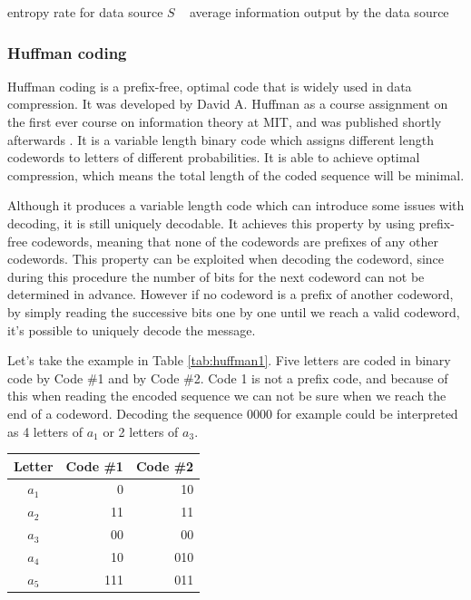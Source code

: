       entropy rate for data source $S$ ~ average information output by the data source

    \subsubsection{Huffman coding}
      Huffman coding is a prefix-free, optimal code that is widely used in data compression. It was developed by David A. Huffman as a course assignment on the first ever course on information theory at MIT, and was published shortly afterwards \cite{huffman_method_1952}. It is a variable length binary code which assigns different length codewords to letters of different probabilities. It is able to achieve optimal compression, which means the total length of the coded sequence will be minimal.

      Although it produces a variable length code which can introduce some issues with decoding, it is still uniquely decodable. It achieves this property by using prefix-free codewords, meaning that none of the codewords are prefixes of any other codewords. This property can be exploited when decoding the codeword, since during this procedure the number of bits for the next codeword can not be determined in advance. However if no codeword is a prefix of another codeword, by simply reading the successive bits one by one until we reach a valid codeword, it's possible to uniquely decode the message.

      Let's take the example in Table \ref{tab:huffman1}. Five letters are coded in binary code by Code \#1 and by Code \#2. Code 1 is not a prefix code, and because of this when reading the encoded sequence we can not be sure when we reach the end of a codeword. Decoding the sequence 0000 for example could be interpreted as 4 letters of $a_1$ or 2 letters of $a_3$.

      \begin{table}
        \centering
        \begin{tabular}{crr}
          \toprule
          Letter & Code \#1 & Code \#2 \\
          \midrule
          $a_1$ & 0	& 10 \\
          $a_2$ & 11	& 11 \\
          $a_3$ & 00	& 00 \\
          $a_4$ & 10 	& 010 \\
          $a_5$ & 111	& 011 \\
          \bottomrule
        \end{tabular}
        \label{tab:prefix}
      \end{table}


